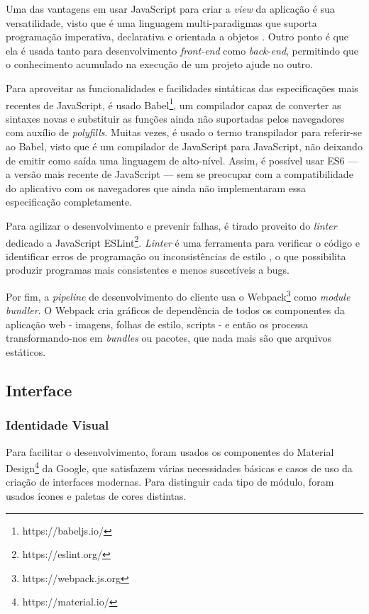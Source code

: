 Uma das vantagens em usar JavaScript para criar a \emph{view} da aplicação é sua versatilidade, visto que é uma linguagem multi-paradigmas que suporta programação imperativa, declarativa e orientada a objetos \cite{mdnjs}. Outro ponto é que ela é usada tanto para desenvolvimento \emph{front-end} como \emph{back-end}, permitindo que o conhecimento acumulado na execução de um projeto ajude no outro.

Para aproveitar as funcionalidades e facilidades sintáticas das especificações mais recentes de JavaScript, é usado Babel\footnote{https://babeljs.io/}, um compilador capaz de converter as sintaxes novas e substituir as funções ainda não suportadas pelos navegadores com auxílio de \textit{polyfills}. Muitas vezes, é usado o termo transpilador para referir-se ao Babel, visto que é um compilador de JavaScript para JavaScript, não deixando de emitir como saída uma linguagem de alto-nível. Assim, é possível usar ES6 --- a versão mais recente de JavaScript --- sem se preocupar com a compatibilidade do aplicativo com os navegadores que ainda não implementaram essa especificação completamente.

Para agilizar o desenvolvimento e prevenir falhas, é tirado proveito do \textit{linter} dedicado a JavaScript ESLint\footnote{https://eslint.org/}. \textit{Linter} é uma ferramenta para verificar o código e identificar erros de programação ou inconsistências de estilo \cite{linter}, o que possibilita produzir programas mais consistentes e menos suscetíveis a bugs.

Por fim, a \emph{pipeline} de desenvolvimento do cliente usa o Webpack\footnote{https://webpack.js.org} como \textit{module bundler}. O Webpack cria gráficos de dependência de todos os componentes da aplicação web - imagens, folhas de estilo, scripts - e então os processa transformando-nos em \textit{bundles} ou pacotes, que nada mais são que arquivos estáticos.

\subsection{Interface}

\subsubsection{Identidade Visual}

Para facilitar o desenvolvimento, foram usados os componentes do Material Design\footnote{https://material.io/} da Google, que satisfazem várias necessidades básicas e casos de uso da criação de interfaces modernas. Para distinguir cada tipo de módulo, foram usados ícones e paletas de cores distintas.

